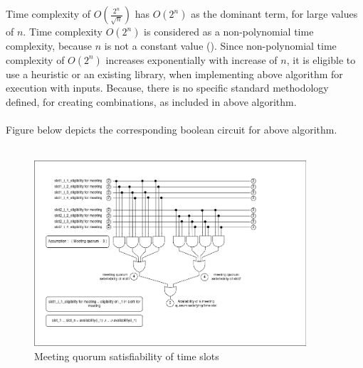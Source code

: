 Time complexity of $O(\frac{2^{n}}{\sqrt{n}})$ has $O(2^{n})$ as the dominant term, for large values of $n$. Time complexity $O(2^{n})$ is considered as a non-polynomial time complexity, because $n$ is not a constant value (\cite{pfleeger1996chapter3}). Since non-polynomial time complexity of $O(2^{n})$ increases exponentially with increase of $n$, it is eligible to use a heuristic or an existing library, when implementing above algorithm for execution with inputs. Because, there is no specific standard methodology defined, for creating combinations, as included in above algorithm.\\ \\
Figure below depicts the corresponding boolean circuit for above algorithm.\\ \\

\begin{figure}[H]
    \centering
    \includegraphics[width=0.9\textwidth]{./image/circuit_diagram/3_quorum_satisfying_slot_selection.png}
    \caption{Meeting quorum satisfiability of time slots}
    \label{fig:meeting quorum satisfiability of time slots}
\end{figure} 

